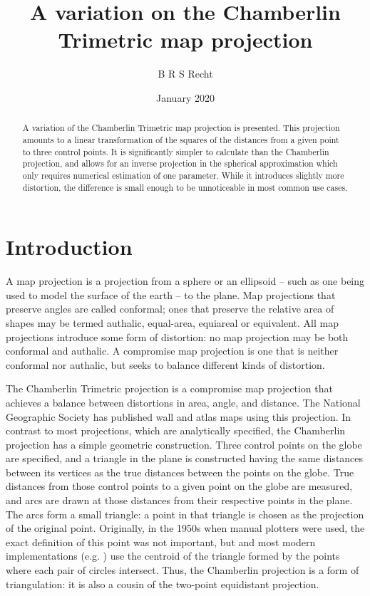 \documentclass{amsart}[12pt]
\title{A variation on the Chamberlin Trimetric map projection}
\author{B R S Recht}
\date{January 2020}
\begin{document}
\begin{abstract}
   A variation of the Chamberlin Trimetric map projection is presented. This
   projection amounts to a linear transformation of the squares of the distances
   from a given point to three control points. It is significantly simpler to
   calculate than the Chamberlin projection, and allows for an inverse
   projection in the spherical approximation which only requires numerical
   estimation of one parameter. While it introduces slightly more distortion,
   the difference is small enough to be unnoticeable in most common use cases.
\end{abstract}
\maketitle

\section{Introduction}
A map projection is a projection from a sphere or an ellipsoid -- such as one
being used to model the surface of the earth -- to the plane. Map projections
that preserve angles are called conformal; ones that preserve the relative area
of shapes may be termed authalic, equal-area, equiareal or equivalent. All map
projections introduce some form of distortion: no map projection may be both
conformal and authalic.\cite{snyder87} A compromise map projection is one that
is neither conformal nor authalic, but seeks to balance different kinds of
distortion.

The Chamberlin Trimetric projection is a compromise map projection that achieves
a balance between distortions in area, angle, and distance. The National
Geographic Society has published wall and atlas maps using this projection. In
contrast to most projections, which are analytically specified, the Chamberlin
projection has a simple geometric construction. Three control points on the
globe are specified, and a triangle in the plane is constructed having the same
distances between its vertices as the true distances between the points on the
globe. True distances from those control points to a given point on the globe
are measured, and arcs are drawn at those distances from their respective
points in the plane. The arcs form a small triangle: a point in that triangle
is chosen as the projection of the original point.\cite{christensen}
Originally, in the 1950s when manual plotters were used, the exact definition
of this point was not important, but \cite{christensen} and most modern
implementations (e.g. \cite{proj}) use the centroid of the triangle formed by
the points where each pair of circles intersect. Thus, the Chamberlin
projection is a form of triangulation: it is also a cousin of the
two-point equidistant projection.\cite{snyder89}
\end{document}
